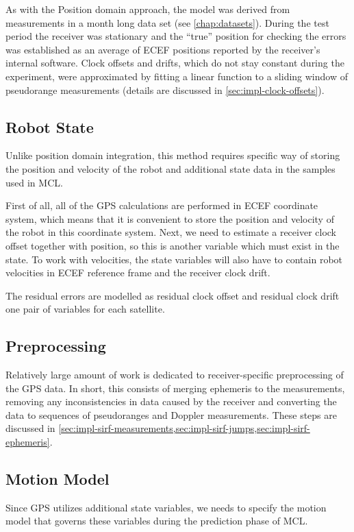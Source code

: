 As with the Position domain approach, the model was derived from
measurements in a month long data set (see \cref{chap:datasets}).
During the test period the receiver was stationary and
the \enquote{true} position for checking the errors was established as an average of ECEF
positions reported by the receiver's internal software.
Clock offsets and drifts, which do not stay constant during the experiment,
were approximated by fitting a linear function to a sliding window of pseudorange
measurements (details are discussed in \cref{sec:impl-clock-offsets}).

\subsection{Robot State}
Unlike position domain integration, this method requires specific
way of storing the position and velocity of the robot and
additional state data in the samples used in MCL.

First of all, all of the GPS calculations are performed in ECEF coordinate system,
which means that it is convenient to store the position and velocity of the robot in this coordinate system.
Next, we need to estimate a receiver clock offset together
with position, so this is another variable which must exist in the state.
To work with velocities, the state variables will also have to contain robot velocities in
ECEF reference frame and the receiver clock drift.

The residual errors are modelled as residual clock offset and residual clock drift
one pair of variables for each satellite.

\subsection{Preprocessing}
Relatively large amount of work is dedicated to receiver-specific preprocessing
of the GPS data.
In short, this consists of merging ephemeris to the measurements, removing
any inconsistencies in data caused by the
receiver and converting the data to sequences of pseudoranges and Doppler measurements.
These steps are discussed in \cref{sec:impl-sirf-measurements,sec:impl-sirf-jumps,sec:impl-sirf-ephemeris}.

\subsection{Motion Model}
Since GPS utilizes additional state variables, we needs to specify the motion
model that governs these variables during the prediction phase of MCL.

